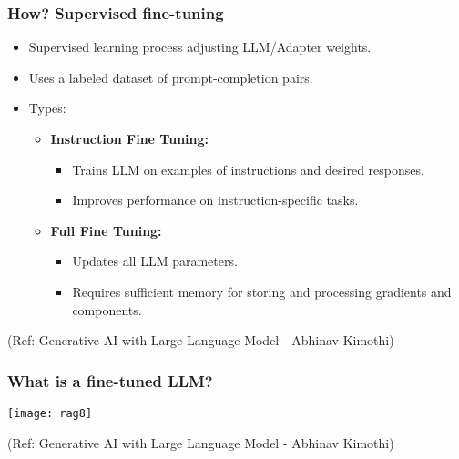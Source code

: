 \begin{frame}[fragile]\frametitle{How? Supervised fine-tuning}


\begin{itemize}
  \item Supervised learning process adjusting LLM/Adapter weights.
  \item Uses a labeled dataset of prompt-completion pairs.
  \item Types:
  \begin{itemize}
	  \item \textbf{Instruction Fine Tuning:}
		\begin{itemize}
		  \item Trains LLM on examples of instructions and desired responses.
		  \item Improves performance on instruction-specific tasks.
		\end{itemize}

	  \item \textbf{Full Fine Tuning:}
		\begin{itemize}
		  \item Updates all LLM parameters.
		  \item Requires sufficient memory for storing and processing gradients and components.
		\end{itemize}
  \end{itemize}

\end{itemize}


{\tiny (Ref: Generative AI with Large Language Model - Abhinav  Kimothi)}

\end{frame}

\begin{frame}[fragile]\frametitle{What is a fine-tuned LLM?}


		\begin{center}
		\texttt{[image: rag8]}
		\end{center}

{\tiny (Ref: Generative AI with Large Language Model - Abhinav  Kimothi)}

\end{frame}




